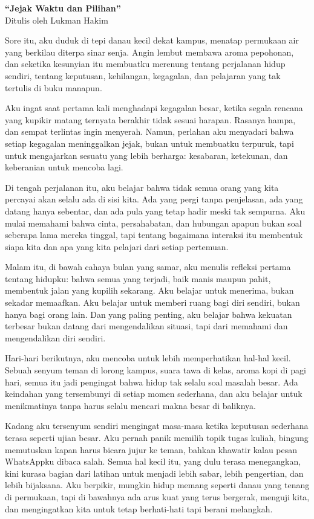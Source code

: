 \documentclass[
  letterpaper,
  DIV=11,
  numbers=noendperiod]{scrreprt}
\begin{document}
\textbf{``Jejak Waktu dan Pilihan''}\\
Ditulis oleh Lukman Hakim

Sore itu, aku duduk di tepi danau kecil dekat kampus, menatap permukaan
air yang berkilau diterpa sinar senja. Angin lembut membawa aroma
pepohonan, dan seketika kesunyian itu membuatku merenung tentang
perjalanan hidup sendiri, tentang keputusan, kehilangan, kegagalan, dan
pelajaran yang tak tertulis di buku manapun.

Aku ingat saat pertama kali menghadapi kegagalan besar, ketika segala
rencana yang kupikir matang ternyata berakhir tidak sesuai harapan.
Rasanya hampa, dan sempat terlintas ingin menyerah. Namun, perlahan aku
menyadari bahwa setiap kegagalan meninggalkan jejak, bukan untuk
membuatku terpuruk, tapi untuk mengajarkan sesuatu yang lebih berharga:
kesabaran, ketekunan, dan keberanian untuk mencoba lagi.

Di tengah perjalanan itu, aku belajar bahwa tidak semua orang yang kita
percayai akan selalu ada di sisi kita. Ada yang pergi tanpa penjelasan,
ada yang datang hanya sebentar, dan ada pula yang tetap hadir meski tak
sempurna. Aku mulai memahami bahwa cinta, persahabatan, dan hubungan
apapun bukan soal seberapa lama mereka tinggal, tapi tentang bagaimana
interaksi itu membentuk siapa kita dan apa yang kita pelajari dari
setiap pertemuan.

Malam itu, di bawah cahaya bulan yang samar, aku menulis refleksi
pertama tentang hidupku: bahwa semua yang terjadi, baik manis maupun
pahit, membentuk jalan yang kupilih sekarang. Aku belajar untuk
menerima, bukan sekadar memaafkan. Aku belajar untuk memberi ruang bagi
diri sendiri, bukan hanya bagi orang lain. Dan yang paling penting, aku
belajar bahwa kekuatan terbesar bukan datang dari mengendalikan situasi,
tapi dari memahami dan mengendalikan diri sendiri.

Hari-hari berikutnya, aku mencoba untuk lebih memperhatikan hal-hal
kecil. Sebuah senyum teman di lorong kampus, suara tawa di kelas, aroma
kopi di pagi hari, semua itu jadi pengingat bahwa hidup tak selalu soal
masalah besar. Ada keindahan yang tersembunyi di setiap momen sederhana,
dan aku belajar untuk menikmatinya tanpa harus selalu mencari makna
besar di baliknya.

Kadang aku tersenyum sendiri mengingat masa-masa ketika keputusan
sederhana terasa seperti ujian besar. Aku pernah panik memilih topik
tugas kuliah, bingung memutuskan kapan harus bicara jujur ke teman,
bahkan khawatir kalau pesan WhatsAppku dibaca salah. Semua hal kecil
itu, yang dulu terasa menegangkan, kini kurasa bagian dari latihan untuk
menjadi lebih sabar, lebih pengertian, dan lebih bijaksana. Aku
berpikir, mungkin hidup memang seperti danau yang tenang di permukaan,
tapi di bawahnya ada arus kuat yang terus bergerak, menguji kita, dan
mengingatkan kita untuk tetap berhati-hati tapi berani melangkah.
\end{document}
